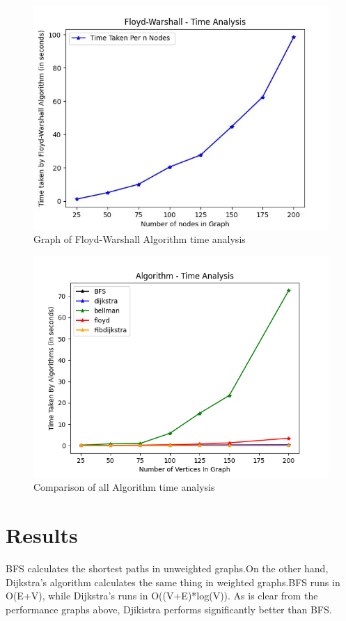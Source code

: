 \documentclass[a4paper, 12pt]{report}
\begin{document}
    \begin{figure}
        \centering
        \includegraphics[width=12cm]{images/Floyd-Warshall.JPG}
        \caption{Graph of Floyd-Warshall Algorithm time analysis}
        \label{fig:picture6}
    \end{figure}
    \begin{figure}
        \centering
        \includegraphics[width=12cm]{images/comparision.png}
        \caption{Comparison of all Algorithm time analysis}
        \label{fig:picture7}
    \end{figure}
    
    \pagebreak
    \section{Results}

    BFS calculates the shortest paths in unweighted graphs.On the other hand, Dijkstra's algorithm calculates the same thing in weighted graphs.BFS runs in O(E+V), while Dijkstra's runs in O((V+E)*log(V)). As is clear from the performance graphs above, Djikistra performs significantly better than BFS.\\
\end{document}
